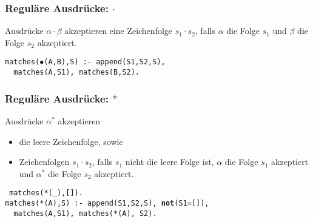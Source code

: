 \documentclass{beamer}
\begin{document}
\begin{frame}
  \frametitle{Reguläre Ausdrücke: $\cdot$}
  Ausdrücke $α \cdot β$ akzeptieren eine Zeichenfolge $s_1 \cdot s_2$, falls $α$ die Folge $s_1$ und $β$ die Folge $s_2$ akzeptiert.
  
  \pause
  \texttt{matches($•$(A,B),S) :- append(S1,S2,S),\\
    \texttt{ }\texttt{ }matches(A,S1), matches(B,S2).}
\end{frame}

\begin{frame}
  \frametitle{Reguläre Ausdrücke: $*$}
  Ausdrücke $α^*$ akzeptieren
  \begin{itemize}
  \item die leere Zeichenfolge, sowie
  \item Zeichenfolgen $s_1 \cdot s_2$, falls $s_1$ nicht die leere Folge ist, $α$ die Folge $s_1$ akzeptiert und $α^*$ die Folge $s_2$ akzeptiert.
  \end{itemize}
  
  \pause
  \texttt{%
    matches(*(\_),[]).\\ \pause
    matches(*(A),S) :- append(S1,S2,S), \textbf{not}(S1=[]),\\
      \texttt{ }\texttt{ }matches(A,S1), matches(*(A), S2).
  }
\end{frame}
\end{document}
